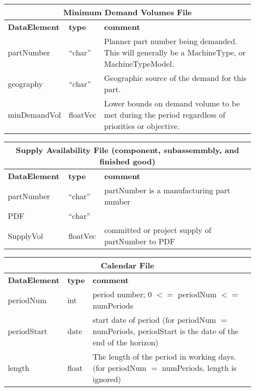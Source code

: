\vspace{.5in}

\begin{tabular}{llp{4in}}
\multicolumn{3}{c}{{\bf Minimum Demand Volumes File}}\\ 
     \hline\hline
{\bf DataElement} &  {\bf type}  &   {\bf comment} \\ \hline
partNumber  & ``char'' & Planner part number being demanded.  This will generally be a
                        MachineType, or MachineTypeModel. \\
geography  &  ``char'' &    Geographic source of the demand for this part. \\
minDemandVol & floatVec &  Lower bounds on demand volume to be met during the period
                        regardless of priorities or objective.
\end{tabular}

\vspace{.5in}

\begin{tabular}{llp{4in}}
\multicolumn{3}{c}{{\bf Supply Availability File (component,  subassemmbly, and finished good)}}\\ 
     \hline\hline
{\bf DataElement} &  {\bf type}  &   {\bf comment} \\ \hline
partNumber  &  ``char''  & partNumber is a manufacturing part number\\
PDF   & ``char''  \\
SupplyVol        & floatVec &  committed or project supply of partNumber to PDF \\
\end{tabular}

\vspace{.5in}

\begin{tabular}{llp{4in}}
\multicolumn{3}{c}{{\bf Calendar File}}\\ 
     \hline\hline
{\bf DataElement} &  {\bf type}  &   {\bf comment} \\ \hline
periodNum      &   int  &   period number;  0 $<=$ periodNum $<=$ numPeriods \\
periodStart    &   date  &  start date of period (for periodNum $=$ numPeriods,
                          periodStart is the date of the end of the horizon) \\
length         &   float &  The length of the period in working days.
                          (for periodNum $=$ numPeriods, length is ignored)
\end{tabular}

